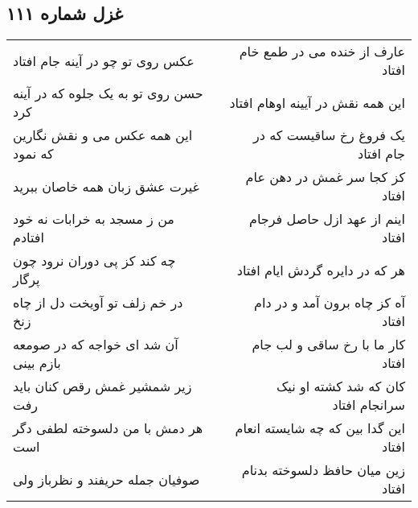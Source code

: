 \begin{center}
\section*{غزل شماره ۱۱۱}
\label{sec:sh111}
\begin{longtable}{l p{0.5cm} r}
عکس روی تو چو در آینه جام افتاد
&&
عارف از خنده می در طمع خام افتاد
\\
حسن روی تو به یک جلوه که در آینه کرد
&&
این همه نقش در آیینه اوهام افتاد
\\
این همه عکس می و نقش نگارین که نمود
&&
یک فروغ رخ ساقیست که در جام افتاد
\\
غیرت عشق زبان همه خاصان ببرید
&&
کز کجا سر غمش در دهن عام افتاد
\\
من ز مسجد به خرابات نه خود افتادم
&&
اینم از عهد ازل حاصل فرجام افتاد
\\
چه کند کز پی دوران نرود چون پرگار
&&
هر که در دایره گردش ایام افتاد
\\
در خم زلف تو آویخت دل از چاه زنخ
&&
آه کز چاه برون آمد و در دام افتاد
\\
آن شد ای خواجه که در صومعه بازم بینی
&&
کار ما با رخ ساقی و لب جام افتاد
\\
زیر شمشیر غمش رقص کنان باید رفت
&&
کان که شد کشته او نیک سرانجام افتاد
\\
هر دمش با من دلسوخته لطفی دگر است
&&
این گدا بین که چه شایسته انعام افتاد
\\
صوفیان جمله حریفند و نظرباز ولی
&&
زین میان حافظ دلسوخته بدنام افتاد
\\
\end{longtable}
\end{center}
